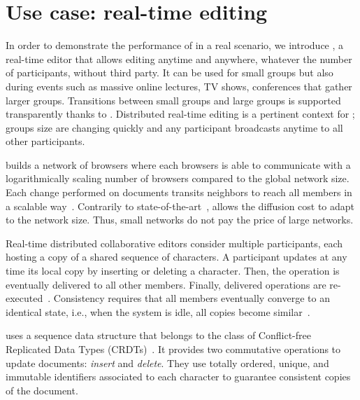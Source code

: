 
\section{Use case: real-time editing}
\label{sec:use-case}

In order to demonstrate the performance of \SPRAY in a real scenario,
we introduce \CRATE, a real-time editor that allows editing anytime
and anywhere, whatever the number of participants, without third
party. It can be used for small groups but also during events such as
massive online lectures, TV shows, conferences that gather larger
groups. Transitions between small groups and large groups is supported
transparently thanks to \SPRAY. Distributed real-time editing is a
pertinent context for \SPRAY; groups size are changing quickly and any
participant broadcasts anytime to all other participants.

\CRATE builds a network of browsers where each browsers is able to
communicate with a logarithmically scaling number of browsers compared
to the global network size. Each change performed on documents
transits neighbors to reach all members in a scalable
way~\cite{birman1999bimodal}. Contrarily to
state-of-the-art~\cite{tolgyeski2009adaptive, voulgaris2005cyclon},
\SPRAY allows the diffusion cost to adapt to the network size. Thus,
small networks do not pay the price of large networks.

Real-time distributed collaborative editors consider multiple participants, each
hosting a copy of a shared sequence of characters. A participant updates at any
time its local copy by inserting or deleting a character. Then, the operation is
eventually delivered to all other members. Finally, delivered operations are
re-executed~\cite{saito2005optimistic}. Consistency requires that all members
eventually converge to an identical state, i.e., when the system is idle, all
copies become similar~\cite{bailis2013eventual}.

\CRATE uses a sequence data structure that belongs to the class of Conflict-free
Replicated Data Types (CRDTs)~\cite{shapiro2011conflict,
  shapiro2011comprehensive}. It provides two commutative operations to update
documents: \emph{insert} and \emph{delete}.  They use totally ordered, unique,
and immutable identifiers associated to each character to guarantee consistent
copies of the document. %

